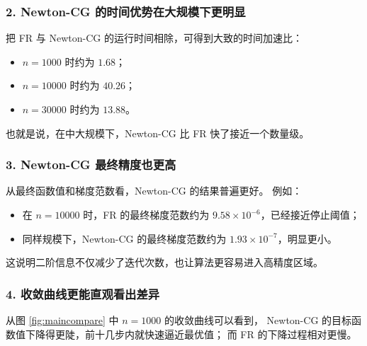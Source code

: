 \documentclass[12pt,a4paper]{ctexart}
\begin{document}
\subsubsection*{2. Newton-CG 的时间优势在大规模下更明显}
把 FR 与 Newton-CG 的运行时间相除，可得到大致的时间加速比：
\begin{itemize}
  \item \(n=1000\) 时约为 \(1.68\)；
  \item \(n=10000\) 时约为 \(40.26\)；
  \item \(n=30000\) 时约为 \(13.88\)。
\end{itemize}

也就是说，在中大规模下，Newton-CG 比 FR 快了接近一个数量级。

\subsubsection*{3. Newton-CG 最终精度也更高}
从最终函数值和梯度范数看，Newton-CG 的结果普遍更好。
例如：
\begin{itemize}
  \item 在 \(n=10000\) 时，FR 的最终梯度范数约为 \(9.58\times 10^{-6}\)，已经接近停止阈值；
  \item 同样规模下，Newton-CG 的最终梯度范数约为 \(1.93\times 10^{-7}\)，明显更小。
\end{itemize}

这说明二阶信息不仅减少了迭代次数，也让算法更容易进入高精度区域。

\subsubsection*{4. 收敛曲线更能直观看出差异}
从图 \ref{fig:maincompare} 中 \(n=1000\) 的收敛曲线可以看到，
Newton-CG 的目标函数值下降得更陡，前十几步内就快速逼近最优值；
而 FR 的下降过程相对更慢。
\end{document}
